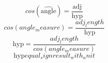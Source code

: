 \[cos(\widehat{{\text{{{angle}}}}})=\frac{{\text{{{adj}}}}}{{\text{{{hyp}}}}}\]
\[cos({angle_measure})=\frac{{{adj_length}}}{{\text{{{hyp}}}}}\]
\[\text{{{hyp}}}=\frac{{{adj_length}}}{{cos({angle_measure})}}\]
\[\text{{{hyp}}}{equal_sign}{result_with_unit}\]
